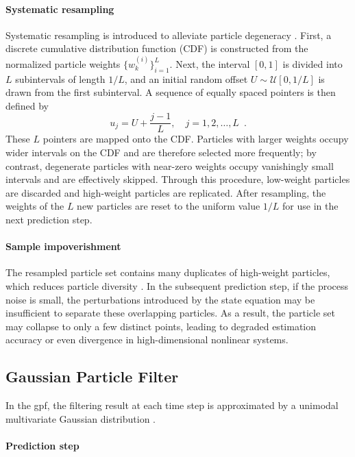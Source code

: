 \paragraph{Systematic resampling}

Systematic resampling is introduced to alleviate particle degeneracy \cite{PF01}. First, a discrete cumulative distribution function (CDF) is constructed from the normalized particle weights $\{w_k^{(i)}\}_{i=1}^L$. Next, the interval $[0,1]$ is divided into $L$ subintervals of length $1/L$, and an initial random offset $U \sim \mathcal{U}[0, 1/L]$ is drawn from the first subinterval. A sequence of equally spaced pointers is then defined by
\[
u_j = U + \frac{j-1}{L}, \quad j = 1, 2, \dots, L\enspace.
\]
These $L$ pointers are mapped onto the CDF. Particles with larger weights occupy wider intervals on the CDF and are therefore selected more frequently; by contrast, degenerate particles with near-zero weights occupy vanishingly small intervals and are effectively skipped. Through this procedure, low-weight particles are discarded and high-weight particles are replicated. After resampling, the weights of the $L$ new particles are reset to the uniform value $1/L$ for use in the next prediction step.
\clearpage

\paragraph{Sample impoverishment}

The resampled particle set contains many duplicates of high-weight particles, which reduces particle diversity \cite{PF01,PF02}. In the subsequent prediction step, if the process noise is small, the perturbations introduced by the state equation may be insufficient to separate these overlapping particles. As a result, the particle set may collapse to only a few distinct points, leading to degraded estimation accuracy or even divergence in high-dimensional nonlinear systems.

\subsection{Gaussian Particle Filter}
\label{subsec:gpf}

In the \ac{gpf}, the filtering result at each time step is approximated by a unimodal multivariate Gaussian distribution \cite{GPF}.

\paragraph{Prediction step}

